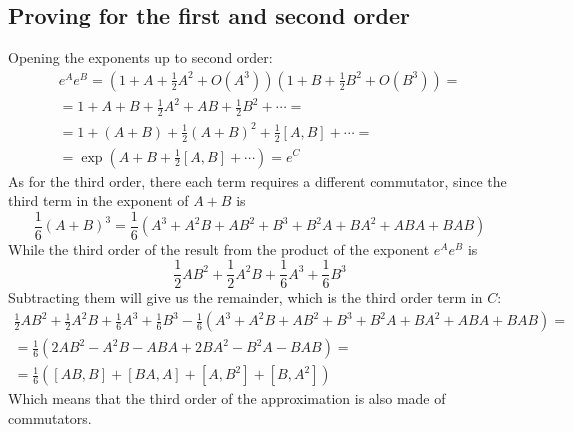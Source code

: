 \documentclass{article}
\begin{document}
\subsection{Proving for the first and second order}
Opening the exponents up to second order:
\begin{equation}
\begin{gathered}
    e^Ae^B = \left(1 + A + \frac{1}{2}A^2 + O(A^3)\right)\left(1 + B + \frac{1}{2}B^2 + O(B^3)\right) = \\ =
    1 + A + B + \frac{1}{2}A^2 + AB + \frac{1}{2}B^2 + \cdots = \\ =
    1 + (A + B) + \frac{1}{2}(A + B)^2 + \frac{1}{2}[A,B] + \cdots = \\ = \exp(A + B + \frac{1}{2}[A,B] + \cdots) = e^C
\end{gathered}
\end{equation}
As for the third order, there each term requires a different commutator, since the third term in the exponent of $A+B$ is
\begin{equation}
    \frac{1}{6}(A+B)^3 = \frac{1}{6}\left(A^3 + A^2B + AB^2 + B^3 + B^2A + BA^2 + ABA + BAB\right)
\end{equation}
While the third order of the result from the product of the exponent $e^Ae^B$ is
\begin{equation}
    \frac{1}{2}AB^2 + \frac{1}{2}A^2B + \frac{1}{6}A^3 + \frac{1}{6}B^3
\end{equation}
Subtracting them will give us the remainder, which is the third order term in $C$:
\begin{equation}
\begin{gathered}
    \frac{1}{2}AB^2 + \frac{1}{2}A^2B + \frac{1}{6}A^3 + \frac{1}{6}B^3 - \frac{1}{6}\left(A^3 + A^2B + AB^2 + B^3 + B^2A + BA^2 + ABA + BAB\right) = \\ =
    \frac{1}{6}\left(2AB^2 - A^2B - ABA + 2BA^2 - B^2A - BAB\right) = \\ =
    \frac{1}{6}\left([AB, B] + [BA, A] + [A,B^2] + [B,A^2]\right)
\end{gathered}
\end{equation}
Which means that the third order of the approximation is also made of commutators.
\end{document}
